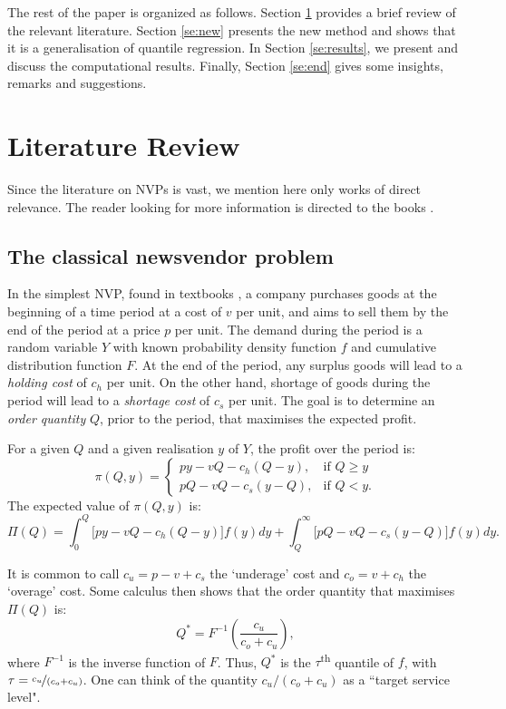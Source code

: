 \documentclass{article}
\begin{document}
The rest of the paper is organized as follows. Section \ref{se:lit} provides a brief review of the relevant literature. Section \ref{se:new} presents the new method and shows that it is a generalisation of quantile regression. In Section \ref{se:results}, we present and discuss the computational results. Finally, Section \ref{se:end} gives some insights, remarks and suggestions.

\section{Literature Review} \label{se:lit}

Since the literature on NVPs is vast, we mention here only works of direct relevance. The reader looking for more information is directed to the books \cite{Ch12,Po02,SPP98,Zi00}.

\subsection{The classical newsvendor problem} %

In the simplest NVP, found in textbooks \cite{Ch12}, a company purchases goods at the beginning of a time period at a cost of $v$ per unit, and aims to sell them by the end of the period at a price $p$ per unit. The demand during the period is a random variable $Y$ with known probability density function $f$ and cumulative distribution function $F$. At the end of the period, any surplus goods will lead to a \emph{holding cost} of $c_h$ per unit. On the other hand, shortage of goods during the period will lead to a \emph{shortage cost} of $c_s$ per unit. The goal is to determine an \emph{order quantity} $Q$, prior to the period, that maximises the expected profit.

For a given $Q$ and a given realisation $y$ of $Y$, the profit over the period is:
\[
    \pi(Q,y)=
    \begin{cases}
        py-vQ-c_h(Q-y),& \text{if } Q\geq y\\
        pQ-vQ-c_s(y-Q),& \text{if } Q< y.
    \end{cases}
\]
The expected value of $\pi(Q,y)$ is:
\[
    \Pi(Q) = \int_{0}^{Q} \big[ py-vQ-c_h(Q-y) \big] f(y)dy + \int_{Q}^{\infty} \big[ pQ-vQ-c_s(y-Q) \big] f(y)dy.
\]

It is common to call $c_u= p-v+c_s$ the ‘underage’ cost and $c_o = v+c_h$ the ‘overage’ cost. Some calculus then shows that the order quantity that maximises $\Pi(Q)$ is:
\[
    Q^* = F^{-1}\left( \frac{c_u}{c_o+c_u} \right),
\]
where $F^{-1}$ is the inverse function of $F$. Thus, $Q^*$ is the $\tau$\textsuperscript{th} quantile of $f$, with $\tau=\nicefrac{c_u}{(c_o+c_u)}$. One can think of the quantity
$c_u/(c_o+c_u)$ as a ``target service level".
\end{document}
